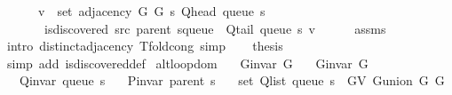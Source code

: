 \begin{isabellebody}
\ \ \ \ \ \ v\ {\isasymin}\ set\ {\isacharparenleft}{\kern0pt}adjacency\ G{}\ G{}\ s\ {\isacharparenleft}{\kern0pt}Q{\isacharunderscore}{\kern0pt}head\ {\isacharparenleft}{\kern0pt}queue\ s{\isacharparenright}{\kern0pt}{\isacharparenright}{\kern0pt}{\isacharparenright}{\kern0pt}\ {\isasymand}\isanewline
\ \ \ \ \ \ {\isasymnot}\ is{\isacharunderscore}{\kern0pt}discovered\ src\ {\isacharparenleft}{\kern0pt}parent\ {\isacharparenleft}{\kern0pt}s{\isasymlparr}queue\ {\isacharcolon}{\kern0pt}{\isacharequal}{\kern0pt}\ Q{\isacharunderscore}{\kern0pt}tail\ {\isacharparenleft}{\kern0pt}queue\ s{\isacharparenright}{\kern0pt}{\isasymrparr}{\isacharparenright}{\kern0pt}{\isacharparenright}{\kern0pt}\ v{\isacharbraceright}{\kern0pt}{\isachardoublequoteclose}\isanewline
\ \ \ \ \isamarkupfalse%
\ assms\isanewline
\ \ \ \ \isamarkupfalse%
\ {\isacharparenleft}{\kern0pt}intro\ distinct{\isacharunderscore}{\kern0pt}adjacency\ T{\isacharunderscore}{\kern0pt}fold{\isacharunderscore}{\kern0pt}cong{\isacharparenright}{\kern0pt}\ simp\isanewline
\ \ \isamarkupfalse%
\ {\isacharquery}{\kern0pt}thesis\isanewline
\ \ \ \ \isamarkupfalse%
\ {\isacharparenleft}{\kern0pt}simp\ add{\isacharcolon}{\kern0pt}\ is{\isacharunderscore}{\kern0pt}discovered{\isacharunderscore}{\kern0pt}def{\isacharparenright}{\kern0pt}\isanewline
{}\isamarkupfalse%
%
\endisatagproof
{\isafoldproof}%
%
\isadelimproof
%
\endisadelimproof
%
\isadelimdocument
%
\endisadelimdocument
%
\isatagdocument
%
\isamarkuptrue%
%
\endisatagdocument
{\isafolddocument}%
%
\isadelimdocument
%
\endisadelimdocument
{}\isamarkupfalse%
\ alt{\isacharunderscore}{\kern0pt}loop{\isacharunderscore}{\kern0pt}dom{\isacharcolon}{\kern0pt}\isanewline
\ \ \ {\isachardoublequoteopen}G{\isachardot}{\kern0pt}invar\ G{}{\isachardoublequoteclose}\isanewline
\ \ \ {\isachardoublequoteopen}G{\isachardot}{\kern0pt}invar\ G{}{\isachardoublequoteclose}\isanewline
\ \ \ {\isachardoublequoteopen}Q{\isacharunderscore}{\kern0pt}invar\ {\isacharparenleft}{\kern0pt}queue\ s{\isacharparenright}{\kern0pt}{\isachardoublequoteclose}\isanewline
\ \ \ {\isachardoublequoteopen}P{\isacharunderscore}{\kern0pt}invar\ {\isacharparenleft}{\kern0pt}parent\ s{\isacharparenright}{\kern0pt}{\isachardoublequoteclose}\isanewline
\ \ \ {\isachardoublequoteopen}set\ {\isacharparenleft}{\kern0pt}Q{\isacharunderscore}{\kern0pt}list\ {\isacharparenleft}{\kern0pt}queue\ s{\isacharparenright}{\kern0pt}{\isacharparenright}{\kern0pt}\ {\isasymsubseteq}\ G{\isachardot}{\kern0pt}V\ {\isacharparenleft}{\kern0pt}G{\isachardot}{\kern0pt}union\ G{}\ G{}{\isacharparenright}{\kern0pt}{\isachardoublequoteclose}\isanewline

\end{isabellebody}
